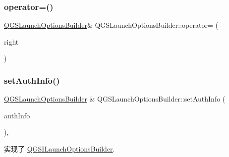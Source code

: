 \mbox{\label{class_q_g_s_launch_options_builder_a895b80f39047c8dedd9bb46e390859db}} 
\subsubsection{\texorpdfstring{operator=()}{operator=()}\hspace{0.1cm}{\footnotesize\ttfamily [2/2]}}
{\footnotesize\ttfamily \mbox{\hyperlink{class_q_g_s_launch_options_builder}{Q\+G\+S\+Launch\+Options\+Builder}}\& Q\+G\+S\+Launch\+Options\+Builder\+::operator= (\begin{DoxyParamCaption}\item[{\mbox{\hyperlink{class_q_g_s_launch_options_builder}{Q\+G\+S\+Launch\+Options\+Builder}} \&\&}]{right }\end{DoxyParamCaption})\hspace{0.3cm}{\ttfamily [delete]}}

\mbox{\label{class_q_g_s_launch_options_builder_a01f8d9b1f6efde74a5a22013d3555c6a}} 
\subsubsection{\texorpdfstring{set\+Auth\+Info()}{setAuthInfo()}}
{\footnotesize\ttfamily \mbox{\hyperlink{class_q_g_s_launch_options_builder}{Q\+G\+S\+Launch\+Options\+Builder}} \& Q\+G\+S\+Launch\+Options\+Builder\+::set\+Auth\+Info (\begin{DoxyParamCaption}\item[{const \mbox{\hyperlink{class_q_g_s_auth_info}{Q\+G\+S\+Auth\+Info}} \&}]{auth\+Info }\end{DoxyParamCaption})\hspace{0.3cm}{\ttfamily [override]}, {\ttfamily [virtual]}}



实现了 \mbox{\hyperlink{class_q_g_s_i_launch_options_builder_a8d9cf0b083391ec128ca601f95436aa8}{Q\+G\+S\+I\+Launch\+Options\+Builder}}.

